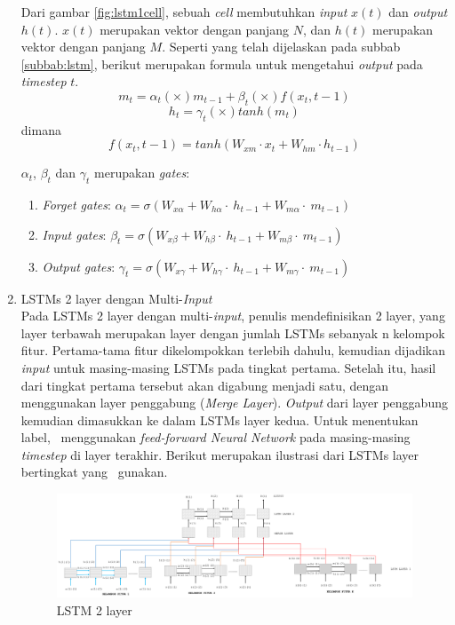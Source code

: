 \begin{enumerate}
	Dari gambar \ref{fig:lstm1cell}, sebuah \textit{cell} membutuhkan \textit{input} $ x(t) $ dan \textit{output} $ h(t) $. $ x(t) $ merupakan vektor dengan panjang $ N $, dan $ h(t) $ merupakan vektor dengan panjang $ M $. Seperti yang telah dijelaskan pada subbab \ref{subbab:lstm}, berikut merupakan formula untuk mengetahui \textit{output} pada \textit{timestep} $ t $.
	\begin{equation}\label{eq:lstmm}
	m_{t}=\alpha_{t} (\times) m_{t-1} + \beta_{t} (\times) f(x_{t},{t-1})
	\end{equation}
	\begin{equation}\label{eq:lstmh}
	h_{t}=\gamma_{t} (\times) tanh(m_{t})
	\end{equation}
	dimana
	\begin{equation}\label{eq:lstmx}
	f(x_{t},{t-1})=tanh(W_{xm} \cdot x_{t} + W_{hm} \cdot h_{t-1})
	\end{equation}
	
	$ \alpha_t $, $ \beta_t $ dan $ \gamma_t $ merupakan \textit{gates}:
	\begin{enumerate}
		\item \textit{Forget gates}: $ \alpha_{t}=\sigma(W_{x\alpha}+W_{h\alpha}\cdot~h_{t-1}+W_{m\alpha}\cdot~m_{t-1}) $
		\item \textit{Input gates}: $ \beta_{t}=\sigma(W_{x\beta}+W_{h\beta}\cdot~h_{t-1}+W_{m\beta}\cdot~m_{t-1}) $
		\item \textit{Output gates}: $ \gamma_{t}=\sigma(W_{x\gamma}+W_{h\gamma}\cdot~h_{t-1}+W_{m\gamma}\cdot~m_{t-1}) $
	\end{enumerate}

	\item LSTMs 2 layer dengan Multi-\textit{Input}\\
	Pada LSTMs 2 layer dengan multi-\textit{input}, penulis mendefinisikan 2 layer, yang layer terbawah merupakan layer dengan jumlah LSTMs sebanyak n kelompok fitur. Pertama-tama fitur dikelompokkan terlebih dahulu, kemudian dijadikan \textit{input} untuk masing-masing LSTMs pada tingkat pertama. Setelah itu, hasil dari tingkat pertama tersebut akan digabung menjadi satu, dengan menggunakan layer penggabung (\textit{Merge Layer}). \textit{Output} dari layer penggabung kemudian dimasukkan ke dalam LSTMs layer kedua. Untuk menentukan label, \saya~menggunakan \textit{feed-forward Neural Network} pada masing-masing \textit{timestep} di layer terakhir. Berikut merupakan ilustrasi dari LSTMs layer bertingkat yang \saya~gunakan.
	
	\begin{figure}
		\centering
		\includegraphics[width=1.0\linewidth]{images/lstm2}
		\caption{LSTM 2 layer}
		\label{fig:lstm2}
	\end{figure}


\end{enumerate}

